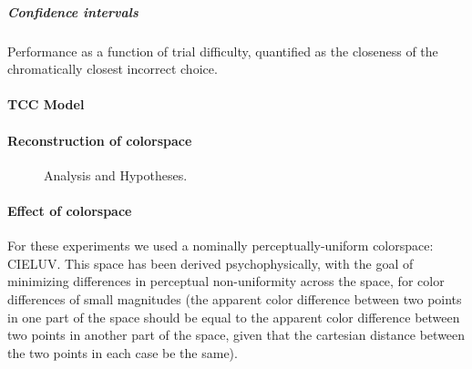 \subparagraph{Confidence intervals}
%
Performance as a function of trial difficulty, quantified as the closeness of the chromatically closest incorrect choice.
\paragraph{TCC Model}

\paragraph{Reconstruction of colorspace}

\begin{figure}

\caption{Analysis and Hypotheses.} 
\label{fig:BiasCalculation}
\end{figure}

\paragraph{Effect of colorspace}
For these experiments we used a nominally perceptually-uniform colorspace: CIELUV. This space has been derived psychophysically, with the goal of minimizing differences in perceptual non-uniformity across the space, for color differences of small magnitudes (the apparent color difference between two points in one part of the space should be equal to the apparent color difference between two points in another part of the space, given that the cartesian distance between the two points in each case be the same).

